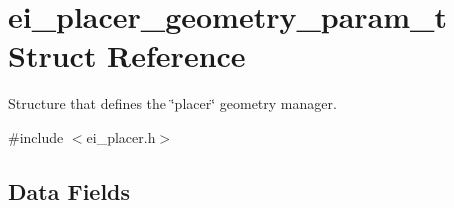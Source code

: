 \hypertarget{structei__placer__geometry__param__t}{\section{ei\+\_\+placer\+\_\+geometry\+\_\+param\+\_\+t Struct Reference}
\label{structei__placer__geometry__param__t}
}


Structure that defines the \char`\"{}placer\char`\"{} geometry manager.  




{\ttfamily \#include $<$ei\+\_\+placer.\+h$>$}

\subsection*{Data Fields}
